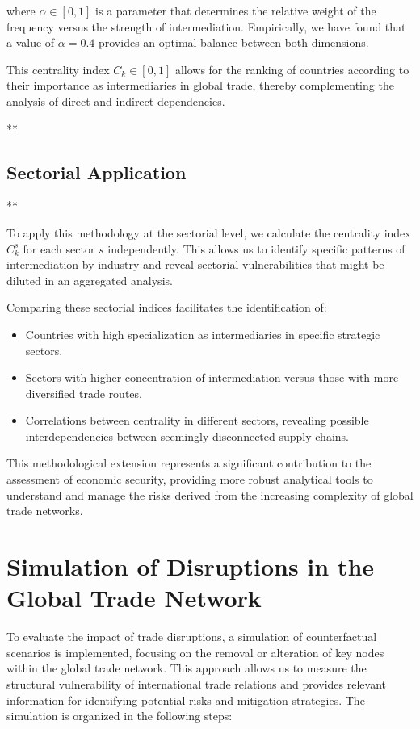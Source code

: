 \documentclass[final,1p,times,authoryear]{elsarticle}
\begin{document}
where $\alpha \in [0,1]$ is a parameter that determines the relative weight of the frequency versus the strength of intermediation. Empirically, we have found that a value of $\alpha = 0.4$ provides an optimal balance between both dimensions.

This centrality index $C_k \in [0,1]$ allows for the ranking of countries according to their importance as intermediaries in global trade, thereby complementing the analysis of direct and indirect dependencies.

**\subsection{Sectorial Application}**

To apply this methodology at the sectorial level, we calculate the centrality index $C_k^s$ for each sector $s$ independently. This allows us to identify specific patterns of intermediation by industry and reveal sectorial vulnerabilities that might be diluted in an aggregated analysis.

Comparing these sectorial indices facilitates the identification of:

\begin{itemize}
    \item Countries with high specialization as intermediaries in specific strategic sectors.
    \item Sectors with higher concentration of intermediation versus those with more diversified trade routes.
    \item Correlations between centrality in different sectors, revealing possible interdependencies between seemingly disconnected supply chains.
\end{itemize}

This methodological extension represents a significant contribution to the assessment of economic security, providing more robust analytical tools to understand and manage the risks derived from the increasing complexity of global trade networks.

\section{Simulation of Disruptions in the Global Trade Network}

To evaluate the impact of trade disruptions, a simulation of counterfactual scenarios is implemented, focusing on the removal or alteration of key nodes within the global trade network. This approach allows us to measure the structural vulnerability of international trade relations and provides relevant information for identifying potential risks and mitigation strategies. The simulation is organized in the following steps:
\end{document}
